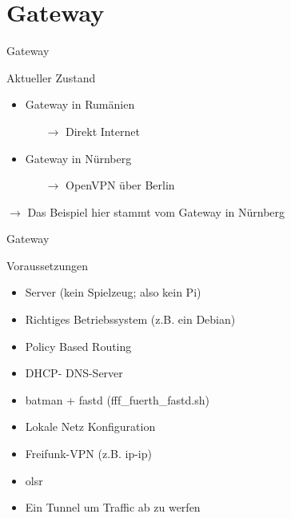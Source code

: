 \section{Gateway}


\begin{frame}{Gateway}
    \begin{block}{Aktueller Zustand}
        \begin{itemize}
            \item Gateway in Rumänien
            \begin{itemize}
                \item[$\rightarrow$] Direkt Internet
            \end{itemize}
            \item Gateway in Nürnberg
            \begin{itemize}
                \item[$\rightarrow$] OpenVPN über Berlin
            \end{itemize}
        \end{itemize}
    \end{block}

    $\longrightarrow$ Das Beispiel hier stammt vom Gateway in Nürnberg
\end{frame}

\begin{frame}{Gateway}
    \begin{block}{Voraussetzungen}
        \begin{itemize}
            \item Server (kein Spielzeug; also kein Pi)
            \item Richtiges Betriebssystem (z.B. ein Debian)
            \item Policy Based Routing
            \item DHCP- DNS-Server
            \item batman + fastd (fff\_fuerth\_fastd.sh)
            \item Lokale Netz Konfiguration
            \item Freifunk-VPN (z.B. ip-ip)
            \item olsr
            \item Ein Tunnel um Traffic ab zu werfen\\
        \end{itemize}
    \end{block}
\end{frame}


